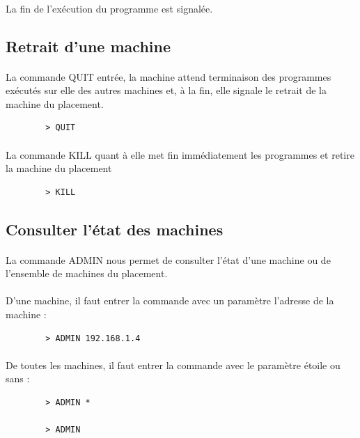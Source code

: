       \paragraph{}
      La fin de l'exécution du programme est signalée.
      
       
      \subsection{Retrait d'une machine}
      \paragraph{}
      La commande QUIT entrée, la machine attend terminaison des 
      programmes exécutés sur elle des autres machines et, à la fin, elle 
      signale le retrait de la machine du placement.
      \begin{verbatim}
        > QUIT
      \end{verbatim}     
      
      \paragraph{}
      La commande KILL quant à elle met fin immédiatement les programmes 
      et retire la machine du placement
      \begin{verbatim}
        > KILL
      \end{verbatim}
      
      
    \subsection{Consulter l'état des machines}
      \paragraph{}
      La commande ADMIN nous permet de consulter l'état d'une machine ou 
      de l'ensemble de machines du placement. 
      
      \paragraph{}
      D'une machine, il faut entrer la commande avec un paramètre 
      l'adresse de la machine :
      \begin{verbatim}
        > ADMIN 192.168.1.4
      \end{verbatim}      
      
      \paragraph{}
      De toutes les machines, il faut entrer la commande avec le 
      paramètre étoile ou sans :
      \begin{verbatim}
        > ADMIN *
        
        > ADMIN
      \end{verbatim}
      
